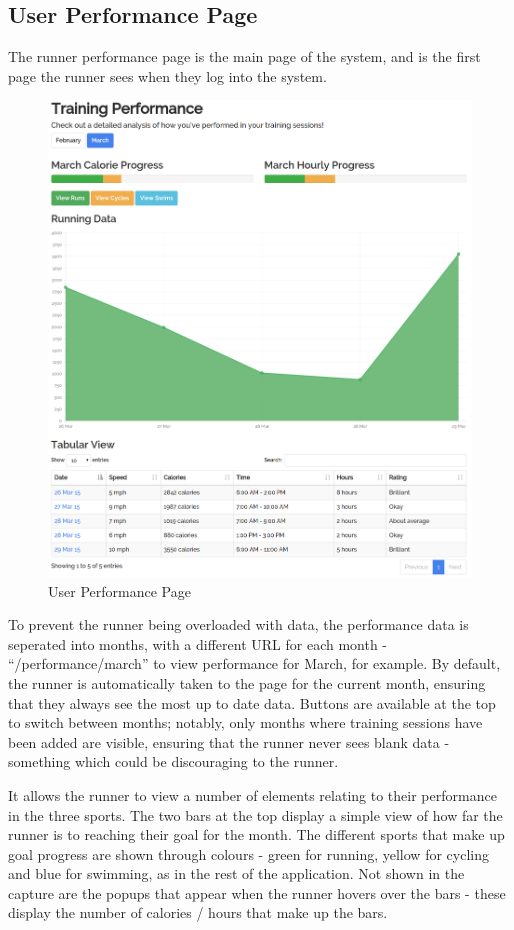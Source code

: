 \documentclass{article}[12pt,a4paper]
\begin{document}
\subsection{User Performance Page}
The runner performance page is the main page of the system, and is the first page the runner sees when they log into the system.

\begin{figure}[h!]
  \includegraphics[scale=0.35]{final_ui/user_performance}
  \caption{User Performance Page}
\end{figure}
\clearpage

To prevent the runner being overloaded with data, the performance data is seperated into months, with a different URL for each month - ``/performance/march'' to view performance for March, for example. By default, the runner is automatically taken to the page for the current month, ensuring that they always see the most up to date data. Buttons are available at the top to switch between months; notably, only months where training sessions have been added are visible, ensuring that the runner never sees blank data - something which could be discouraging to the runner.

It allows the runner to view a number of elements relating to their performance in the three sports. The two bars at the top display a simple view of how far the runner is to reaching their goal for the month. The different sports that make up goal progress are shown through colours - green for running, yellow for cycling and blue for swimming, as in the rest of the application. Not shown in the capture are the popups that appear when the runner hovers over the bars - these display the number of calories / hours that make up the bars. 
\end{document}
